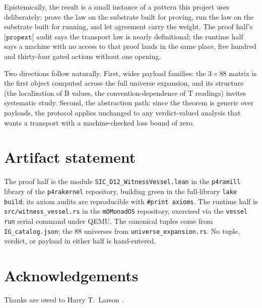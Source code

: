\documentclass[12pt,a4paper]{article}
\newcommand{\bT}{\textsf{T}}
\newcommand{\bB}{\textsf{B}}
\begin{document}
Epistemically, the result is a small instance of a pattern this project
uses deliberately: prove the law on the substrate built for proving, run
the law on the substrate built for running, and let agreement carry the
weight. The proof half's $\texttt{[propext]}$ audit says the transport law
is nearly definitional; the runtime half says a machine with no access to
that proof lands in the same place, five hundred and thirty-four gated
actions without one opening.

Two directions follow naturally. First, wider payload families: the
$3 \times 88$ matrix is the first object computed across the full universe
expansion, and its structure (the localization of \bB{} values, the
convention-dependence of \bT{} readings) invites systematic study. Second,
the abstraction path: since the theorem is generic over payloads, the
protocol applies unchanged to any verdict-valued analysis that wants a
transport with a machine-checked loss bound of zero.

\section{Artifact statement}

The proof half is the module \texttt{SIC\_D12\_WitnessVessel.lean} in the
\texttt{p4ramill} library of the \texttt{p4rakernel} repository, building
green in the full-library \texttt{lake build}; its axiom audits are
reproducible with \texttt{\#print axioms}. The runtime half is
\texttt{src/witness\_vessel.rs} in the \texttt{mOMonadOS} repository,
exercised via the \texttt{vessel run} serial command under QEMU. The
canonical tuples come from \texttt{IG\_catalog.json}; the $88$ universes
from \texttt{universe\_expansion.rs}. No tuple, verdict, or payload in
either half is hand-entered.

\section{Acknowledgements}

Thanks are owed to Harry T.\ Larson \cite{Larson1961}.
\end{document}
